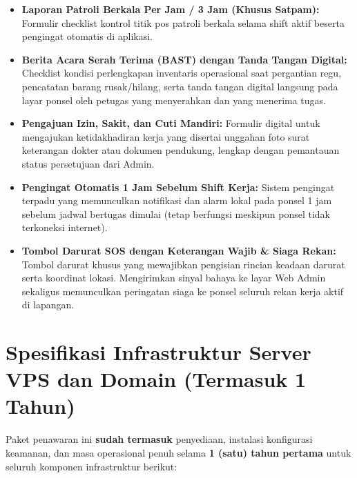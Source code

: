 \documentclass[11pt,a4paper]{article}
\begin{document}
\begin{itemize}
\begin{itemize}
    \end{itemize}
    \item \textbf{Laporan Patroli Berkala Per Jam / 3 Jam (Khusus Satpam):} Formulir checklist kontrol titik pos patroli berkala selama shift aktif beserta pengingat otomatis di aplikasi.
    \item \textbf{Berita Acara Serah Terima (BAST) dengan Tanda Tangan Digital:} Checklist kondisi perlengkapan inventaris operasional saat pergantian regu, pencatatan barang rusak/hilang, serta tanda tangan digital langsung pada layar ponsel oleh petugas yang menyerahkan dan yang menerima tugas.
    \item \textbf{Pengajuan Izin, Sakit, dan Cuti Mandiri:} Formulir digital untuk mengajukan ketidakhadiran kerja yang disertai unggahan foto surat keterangan dokter atau dokumen pendukung, lengkap dengan pemantauan status persetujuan dari Admin.
    \item \textbf{Pengingat Otomatis 1 Jam Sebelum Shift Kerja:} Sistem pengingat terpadu yang memunculkan notifikasi dan alarm lokal pada ponsel 1 jam sebelum jadwal bertugas dimulai (tetap berfungsi meskipun ponsel tidak terkoneksi internet).
    \item \textbf{Tombol Darurat SOS dengan Keterangan Wajib \& Siaga Rekan:} Tombol darurat khusus yang mewajibkan pengisian rincian keadaan darurat serta koordinat lokasi. Mengirimkan sinyal bahaya ke layar Web Admin sekaligus memunculkan peringatan siaga ke ponsel seluruh rekan kerja aktif di lapangan.
\end{itemize}

\section{Spesifikasi Infrastruktur Server VPS dan Domain (Termasuk 1 Tahun)}

Paket penawaran ini \textbf{sudah termasuk} penyediaan, instalasi konfigurasi keamanan, dan masa operasional penuh selama \textbf{1 (satu) tahun pertama} untuk seluruh komponen infrastruktur berikut:
\end{document}
